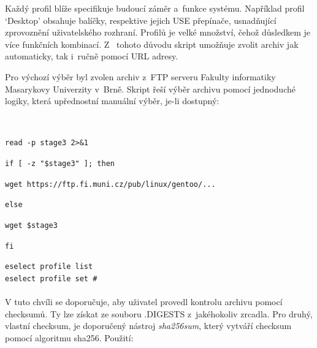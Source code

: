 \documentclass[12pt,a4paper,twoside,]{article}
\begin{document}
{{Každý profil blíže specifikuje budoucí záměr a~funkce systému. Například profil
‘Desktop’ obsahuje balíčky, respektive jejich USE přepínače, usnadňující zprovoznění uživatelského rozhraní.
Profilů je velké množství, čehož důsledkem je více funkčních kombinací. Z~ tohoto důvodu skript umožňuje zvolit archiv jak automaticky, tak i~ručně pomocí URL adresy. 

Pro výchozí výběr byl zvolen archiv z~FTP serveru Fakulty informatiky
Masarykovy Univerzity v~Brně. Skript řeší výběr archivu pomocí jednoduché logiky,
která upřednostní manuální výběr, je-li dostupný:}\\

{\hspace*{+1.5em}\texttt{read -p stage3 2>\&1}\\
{\hspace*{+1.5em}\texttt{if [ -z "\$stage3" ]; then}\\
{\hspace*{+1.5em}\texttt{\hspace*{+1.5em}wget https://ftp.fi.muni.cz/pub/linux/gentoo/...\\}
{\hspace*{+1.5em}\texttt{else}\\
{\hspace*{+1.5em}\texttt{\hspace*{+1.5em}wget \$stage3}\\
{\hspace*{+1.5em}\texttt{fi}\\

\hspace{-1.5em}{Nesprávně zvolený profil lze po dokončení instalace změnit pomocí:\\}

\texttt{eselect profile list}\\
\texttt{\hspace*{--1.5em}eselect profile set \#}\\

\hspace{-1.5em}{Uživatel by však měl mít na paměti, že změna profilu může v~některých případech
vést až k~překompilování celého systému.}\\

\hspace{-1.5em}V tuto chvíli se doporučuje, aby uživatel provedl kontrolu archivu pomocí checksumů.
Ty lze získat ze souboru .DIGESTS z~jakéhokoliv zrcadla. Pro druhý, vlastní checksum, je doporučený nástroj \textit{sha256sum}, který vytváří checksum pomocí algoritmu sha256. Použití:

}}}}}}}
\end{document}
